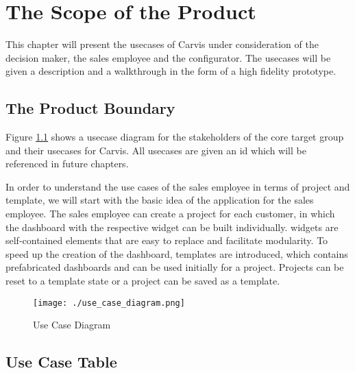 \chapter{The Scope of the Product}
This chapter will present the \glspl{usecase} of Carvis under consideration of the decision maker, the sales employee and the configurator. The \glspl{usecase} will be given a description and a walkthrough in the form of a high fidelity prototype.

\section{The Product Boundary}

Figure \ref{SopeOfProduct:ContextDiagram} shows a \gls{usecase} diagram for the \glspl{stakeholder} of the core target group and their \glspl{usecase} for Carvis. All \glspl{usecase} are given an id which will be referenced in future chapters.

In order to understand the use cases of the sales employee in terms of project and template, we will start with the basic idea of the application for the sales employee. The sales employee can create a project for each customer, in which the dashboard with the respective \gls{widget} can be built individually. \Glspl{widget} are self-contained elements that are easy to replace and facilitate modularity. To speed up the creation of the dashboard, templates are introduced, which contains prefabricated dashboards and can be used initially for a project. Projects can be reset to a template state or a project can be saved as a template.

\begin{figure}[H]
  \centering
  \texttt{[image: ./use\_case\_diagram.png]}
  \caption{Use Case Diagram}
  \label{SopeOfProduct:ContextDiagram}
\end{figure}

\section{Use Case Table}

